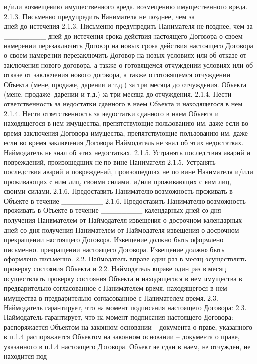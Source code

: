 и/или
возмещению имущественного вреда.
возмещению имущественного вреда.
2.1.3. Письменно предупредить Нанимателя не позднее, чем за ________ дней до
истечения
2.1.3. Письменно предупредить Нанимателя не позднее, чем за ________ дней до
истечения
срока действия настоящего Договора о своем намерении перезаключить Договор на
новых
срока действия настоящего Договора о своем намерении перезаключить Договор на
новых
условиях или об отказе от заключения нового договора, а также о готовящемся
отчуждении
условиях или об отказе от заключения нового договора, а также о готовящемся
отчуждении
Объекта (мене, продаже, дарении и т.д.) за три месяца до отчуждения.
Объекта (мене, продаже, дарении и т.д.) за три месяца до отчуждения.
2.1.4. Нести ответственность за недостатки сданного в наем Объекта и
находящегося в нем
2.1.4. Нести ответственность за недостатки сданного в наем Объекта и
находящегося в нем
имущества, препятствующие пользованию им, даже если во время заключения Договора
имущества, препятствующие пользованию им, даже если во время заключения Договора
Наймодатель не знал об этих недостатках.
Наймодатель не знал об этих недостатках.
2.1.5. Устранять последствия аварий и повреждений, произошедших не по вине
Нанимателя
2.1.5. Устранять последствия аварий и повреждений, произошедших не по вине
Нанимателя
и/или проживающих с ним лиц, своими силами.
и/или проживающих с ним лиц, своими силами.
2.1.6. Предоставить Нанимателю возможность проживать в Объекте в течение
________
2.1.6. Предоставить Нанимателю возможность проживать в Объекте в течение
________
календарных дней со дня получения Нанимателем от Наймодателя извещения о
досрочном
календарных дней со дня получения Нанимателем от Наймодателя извещения о
досрочном
прекращении настоящего Договора. Извещение должно быть оформлено письменно.
прекращении настоящего Договора. Извещение должно быть оформлено письменно.
2.2. Наймодатель вправе один раз в месяц осуществлять проверку состояния Объекта
и
2.2. Наймодатель вправе один раз в месяц осуществлять проверку состояния Объекта
и
находящегося в нем имущества в предварительно согласованное с Нанимателем время.
находящегося в нем имущества в предварительно согласованное с Нанимателем время.
2.3. Наймодатель гарантирует, что на момент подписания настоящего Договора:
2.3. Наймодатель гарантирует, что на момент подписания настоящего Договора:
распоряжается Объектом на законном основании – документа о праве, указанного в
п.1.4
распоряжается Объектом на законном основании – документа о праве, указанного в
п.1.4
настоящего Договора. Объект не сдан в наем, не отчужден, не находится под
